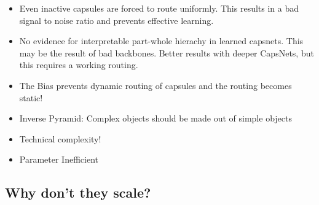 \documentclass{article}
\begin{document}
\begin{itemize}
	\item Even inactive capsules are forced to route uniformly. This results in a bad signal to noise ratio and prevents effective learning.
	\item No evidence for interpretable part-whole hierachy in learned capsnets. This may be the result of bad backbones. Better results with deeper CapsNets, but this requires a working routing.
	\item The Bias prevents dynamic routing of capsules and the routing becomes static!
	\item Inverse Pyramid: Complex objects should be made out of simple objects
	\item Technical complexity!
	\item Parameter Inefficient
\end{itemize}

\subsection{Why don't they scale?}
\end{document}
